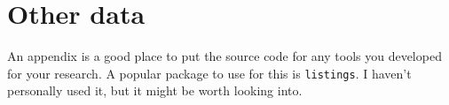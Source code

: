 \documentclass[12pt,oneside]{uvicthesis}
\begin{document}
\appendix
\chapter{Other data}
	An appendix is a good place to put the source code for any tools you developed for your research. A popular package to use for this is \texttt{listings}. I haven't personally used it, but it might be worth looking into.

\backmatter
	
	
\end{document}
